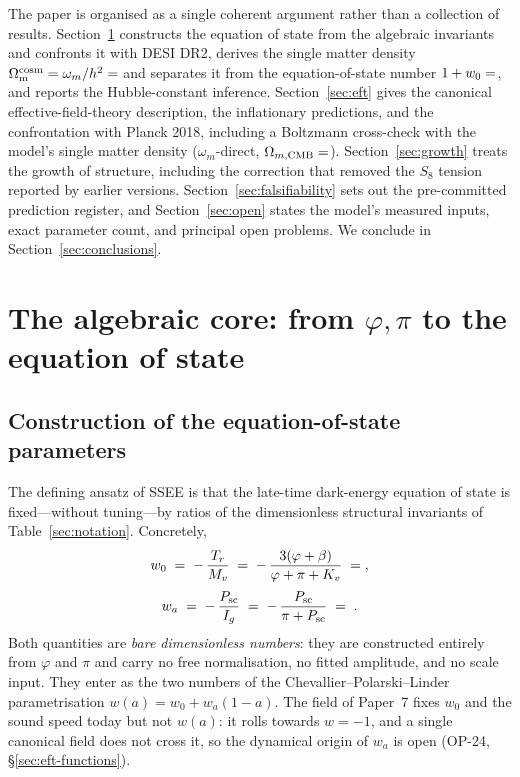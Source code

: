 \documentclass[aps,prd,preprint,amsmath,amssymb,nofootinbib,longbibliography]{revtex4-2}
\newcommand{\Om}{\Omega_{\mathrm{m}}}
\begin{document}
The paper is organised as a single coherent argument rather than a collection of
results. Section~\ref{sec:core} constructs the equation of state from the
algebraic invariants and confronts it with DESI DR2, derives the single matter density
$\Om^{\mathrm{cosm}}=\omega_m/h^2=\val{OMEGA_M_TOTAL_d6}$ and separates it from the
equation-of-state number $1+w_0=\val{S_M_d6}$, and
reports the Hubble-constant inference. Section~\ref{sec:eft} gives the canonical
effective-field-theory description, the inflationary predictions, and the
confrontation with Planck 2018, including a Boltzmann cross-check with the model's single matter density
($\omega_m$-direct, $\Omega_{m,\rm CMB}=\val{OMEGA_M_TOTAL_d6}$). Section~\ref{sec:growth} treats
the growth of structure, including the correction that removed the $S_8$ tension reported by earlier versions.
Section~\ref{sec:falsifiability} sets out the pre-committed prediction register,
and Section~\ref{sec:open} states the model's measured inputs, exact parameter
count, and principal open problems. We conclude in
Section~\ref{sec:conclusions}.

\section{The algebraic core: from $\varphi,\pi$ to the equation of state}
\label{sec:core}

\subsection{Construction of the equation-of-state parameters}
\label{sec:w0wa-construction}
The defining ansatz of SSEE is that the late-time dark-energy equation of
state is fixed---without tuning---by ratios of the dimensionless structural
invariants of Table~\ref{sec:notation}. Concretely,
\begin{equation}
\begin{gathered}
  w_0 \;=\; -\,\frac{T_r}{M_v}
        \;=\; -\,\frac{3(\varphi+\beta)}{\varphi+\pi+K_v}
        \;=\; \val{W0_d6}, \\[3pt]
  w_a \;=\; -\,\frac{P_{\mathrm{sc}}}{I_g}
        \;=\; -\,\frac{P_{\mathrm{sc}}}{\pi+P_{\mathrm{sc}}}
        \;=\; \val{WA_d5} .
\end{gathered}
  \label{eq:w0wa}
\end{equation}
Both quantities are \emph{bare dimensionless numbers}: they are constructed
entirely from $\varphi$ and $\pi$ and carry no free normalisation, no fitted
amplitude, and no scale input. They enter as the two numbers of the Chevallier--Polarski--Linder
parametrisation $w(a)=w_0+w_a(1-a)$. The field of Paper~7 fixes $w_0$ and the
sound speed today but not $w(a)$: it rolls towards $w=-1$, and a single canonical
field does not cross it, so the dynamical origin of $w_a$ is open (OP-24,
\S\ref{sec:eft-functions}).
\end{document}
